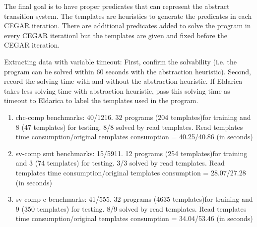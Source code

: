 \documentclass{article}
\begin{document}
The final goal is to have proper predicates that can represent the abstract transition system. The templates are heuristics to generate the predicates in each CEGAR iteration. There are additional predicates added to solve the program in every CEGAR iterationl but the templates are given and fixed before the CEGAR iteration.

%
%

Extracting data with variable timeout: First, confirm the solvability (i.e. the program can be solved within 60 seconds with the abstraction heuristic).
Second, record the solving time with and without the abstraction heuristic. If Eldarica takes less solving time with abstraction heuristic, pass this solving time as timeout to Eldarica to label the templates used in the program.

\begin{enumerate}
  \item chc-comp benchmarks: 40/1216.  32 programs (204 templates)for training and 8 (47 templates) for testing. 8/8 solved by read templates. Read templates time consumption/original templates consumption =  40.25/40.86 (in seconds)
  \item sv-comp smt benchmarks: 15/5911.  12 programs (254 templates)for training and 3 (74 templates) for testing. 3/3 solved by read templates. Read templates time consumption/original templates consumption =  28.07/27.28 (in seconds)
  \item sv-comp c benchmarks: 41/555.  32 programs (4635 templates)for training and 9 (350 templates) for testing. 8/9 solved by read templates. Read templates time consumption/original templates consumption = 34.04/53.46  (in seconds)
\end{enumerate}
\end{document}
